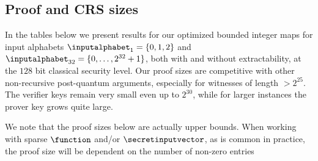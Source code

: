 \subsection{Proof and CRS sizes}
\label{sec:proof-sizes}

In the tables below we present results for our optimized bounded integer maps for input alphabets $\inputalphabet_1 = \{0,1,2\}$ and $\inputalphabet_{32}=\{0,\dotsc,2^{32}+1\}$, both with and without extractability, at the $128$ bit classical security level. Our proof sizes are competitive with other non-recursive post-quantum arguments, especially for witnesses of length $>2^{25}$. The verifier keys remain very small even up to $2^{30}$, while for larger instances the prover key grows quite large.

We note that the proof sizes below are actually upper bounds. When working with sparse $\function$ and/or $\secretinputvector$, as is common in practice, the proof size will be dependent on the number of non-zero entries


